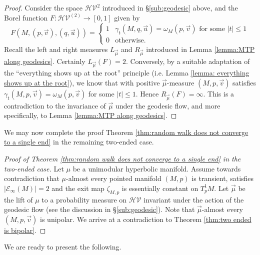\documentclass{amsart}
\newcommand{\HypersV}{\mathcal{HV}}
\newcommand{\EndsInf}[1]{\mathcal{E}_{\infty}\left(#1\right)}
\theoremstyle{plain}
\numberwithin{equation}{section}
\theoremstyle{definition}
\begin{document}
\begin{proof}
Consider the space $\HypersV^2$ introduced in \S\ref{sub:geodesic} above, and the  Borel function $F : \HypersV^{(2)} \to \left[0,1\right]$  given by
\begin{equation}
F(M,(p,\vec{v}),(q,\vec{u})) = \begin{cases}
1 & \text{$\gamma_t(M,q,\vec u) = \omega_M(p,\vec{v})$ for some $|t|\le 1$} \\
0 & \text{otherwise}.
\end{cases}
\end{equation}
Recall the left and right measures $L_{\vec \mu}$ and $R_{\vec \mu}$ introduced in Lemma \ref{lemma:MTP along geodesics}. Certainly $L_{\vec \mu}(F) = 2$. Conversely, by a suitable adaptation of the \enquote{everything shows up at the root} principle (i.e. Lemma \ref{lemma: everything shows up at the root}), we know that with positive $\vec \mu$-measure $(M,p,\vec v)$ satisfies  $\gamma_t (M,p,\vec v) = \omega_M(p,\vec v)$ for some $|t| \le 1$. 
Hence   $R_{\vec \mu}(F) = \infty$. This is a contradiction to the invariance of $\vec \mu$ under the geodesic flow, and more specifically, to Lemma \ref{lemma:MTP along geodesics}.
\end{proof}

We may now complete the proof Theorem \ref{thm:random walk does not converge to a single end} in the remaining two-ended case.  

\begin{proof}[Proof of Theorem \ref{thm:random walk does not converge to a single end} in the two-ended case]
Let $\mu$ be a unimodular hyperbolic manifold. Assume towards contradiction that $\mu$-almost every pointed manifold $(M,p)$ is transient, satisfies $|\EndsInf{M}|=2$ and the exit map $\zeta_{M,p}$ is essentially constant on $T^1_p M$. Let $\vec \mu$ be the lift of $\mu$ to a probability measure on $\HypersV$ invariant under the action of the geodesic flow (see the discussion in \S\ref{sub:geodesic}). Note that $\vec \mu$-almost every $(M,p,\vec v)$ is unipolar. We arrive at a contradiction to Theorem \ref{thm:two ended is bipolar}.
\end{proof}

We are ready to present the following.
\end{document}

